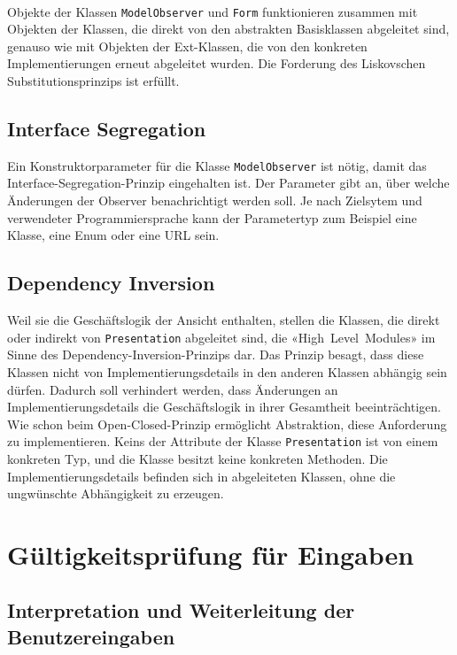 \documentclass{article}
\begin{document}
\paragraph{}
Objekte der Klassen \texttt{ModelObserver} und \texttt{Form} funktionieren zusammen mit Objekten der Klassen, die direkt von den abstrakten Basisklassen abgeleitet sind, genauso wie mit Objekten der Ext-Klassen, die von den konkreten Implementierungen erneut abgeleitet wurden. Die Forderung des Liskovschen Substitutionsprinzips ist erfüllt.

\subsection{Interface Segregation}
Ein Konstruktorparameter für die Klasse \texttt{ModelObserver} ist nötig, damit das Interface-Segregation-Prinzip eingehalten ist. Der Parameter gibt an, über welche Änderungen der Observer benachrichtigt werden soll. Je nach Zielsytem und verwendeter Programmiersprache kann der Parametertyp zum Beispiel eine Klasse, eine Enum oder eine URL sein.

\subsection{Dependency Inversion}
Weil sie die Geschäftslogik der Ansicht enthalten, stellen die Klassen, die direkt oder indirekt von \texttt{Presentation} abgeleitet sind, die «High~Level~Modules» im Sinne des Dependency-Inversion-Prinzips dar. Das Prinzip besagt, dass diese Klassen nicht von Implementierungsdetails in den anderen Klassen abhängig sein dürfen. Dadurch soll verhindert werden, dass Änderungen an Implementierungsdetails die Geschäftslogik in ihrer Gesamtheit beeinträchtigen. Wie schon beim Open-Closed-Prinzip ermöglicht Abstraktion, diese Anforderung zu implementieren. Keins der Attribute der Klasse \texttt{Presentation} ist von einem konkreten Typ, und die Klasse besitzt keine konkreten Methoden. Die Implementierungsdetails befinden sich in abgeleiteten Klassen, ohne die ungwünschte Abhängigkeit zu erzeugen.

\section{Gültigkeitsprüfung für Eingaben}
\subsection{Interpretation und Weiterleitung der Benutzereingaben}
\end{document}
